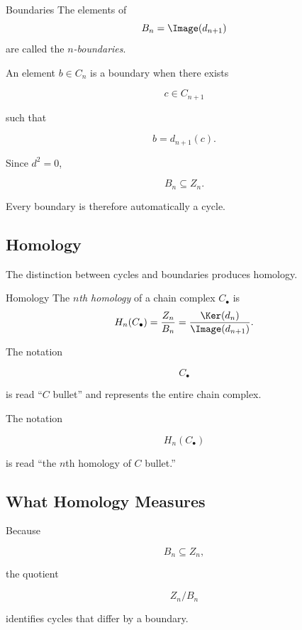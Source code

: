 \begin{definitionbox}{Boundaries}
The elements of
\[ B_n=\Image(d_{n+1}) \]
are called the \emph{\(n\)-boundaries}.
\end{definitionbox}

An element \(b\in C_n\) is a boundary when there exists

\[ c\in C_{n+1} \]

such that

\[ b=d_{n+1}(c). \]

Since \(d^2=0\),

\[ B_n\subseteq Z_n. \]

Every boundary is therefore automatically a cycle.

\subsection{Homology}
\label{subsec:homology-definition}

The distinction between cycles and boundaries produces homology.

\begin{definitionbox}{Homology}
The \emph{\(n\)th homology} of a chain complex \(C_\bullet\) is
\[ H_n(C_\bullet)=\frac{Z_n}{B_n}
=\frac{\Ker(d_n)}{\Image(d_{n+1})}. \]
\end{definitionbox}

The notation

\[ C_\bullet \]

is read ``\(C\) bullet'' and represents the entire chain complex.

The notation

\[ H_n(C_\bullet) \]

is read ``the \(n\)th homology of \(C\) bullet.''

\subsection{What Homology Measures}
\label{subsec:what-homology-measures}

Because

\[ B_n\subseteq Z_n, \]

the quotient

\[ Z_n/B_n \]

identifies cycles that differ by a boundary.

